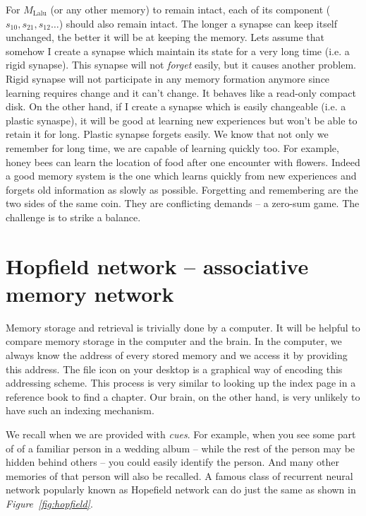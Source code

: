 \documentclass[]{resonance}
\newcommand\Fig[1]{\textit{Figure~\ref{#1}}}
\begin{document}
For $M_\text{Lalu}$ (or any other memory) to remain intact, each of its
component ($s_{10}, s_{21}, s_{12} \ldots$) should also remain intact.  The
longer a synapse can keep itself unchanged, the better it will be at keeping the
memory. Lets assume that somehow I create a synapse which maintain its state for
a very long time (i.e. a rigid synapse). This synapse will not \emph{forget}
easily, but it causes another problem. Rigid synapse will not participate in any
memory formation anymore since learning requires change and it can't change. It
behaves like a read-only compact disk. On the other hand, if I create a synapse
which is easily changeable (i.e. a plastic synaspe), it will be good at learning
new experiences but won't be able to retain it for long. Plastic synapse forgets
easily.  We know that not only we remember for long time, we are capable of
learning quickly too. For example, honey bees can learn the location of food
after one encounter with flowers.  Indeed a good memory system is the one which
learns quickly from new experiences and forgets old information as slowly as
possible.  Forgetting and remembering are the two sides of the same coin.  They
are conflicting demands -- a zero-sum game.  The challenge is to strike a
balance. 

\section{Hopfield network -- associative memory network}\label{sec:hopfield}

Memory storage and retrieval is trivially done by a computer. It will be helpful
to compare memory storage in the computer and the brain. In the computer, we
always know the address of every stored memory and we access it by providing
this address. The file icon on your desktop is a graphical way of encoding this
addressing scheme. This process is very similar to looking up the index page in
a reference book to find a chapter. Our brain, on the other hand, is very
unlikely to have such an indexing mechanism. 

We recall when we are provided with \textit{cues}. For example, when you see
some part of of a familiar person in a wedding album -- while the rest of the
person may be hidden behind others -- you could easily identify the person. And
many other memories of that person will also be recalled. A famous class of
recurrent neural network popularly known as Hopefield network can do just the
same as shown in \Fig{fig:hopfield}.
\end{document}
